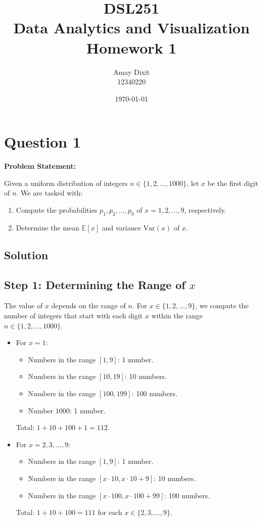 \documentclass[12pt]{article}
\title{DSL251 \\ Data Analytics and Visualization \\ Homework 1}
\author{Amay Dixit \\ 12340220}
\date{\today}
\begin{document}
\maketitle

\section*{Question 1}

\textbf{Problem Statement:}

Given a uniform distribution of integers \( n \in \{1, 2, \dots, 1000\} \), let \( x \) be the first digit of \( n \). We are tasked with:
\begin{enumerate}
    \item Compute the probabilities \( p_1, p_2, \dots, p_9 \) of \( x = 1, 2, \dots, 9 \), respectively.
    \item Determine the mean \( \mathbb{E}[x] \) and variance \( \mathrm{Var}(x) \) of \( x \).
\end{enumerate}

\subsection*{Solution}

\subsection*{Step 1: Determining the Range of \( x \)}

The value of \( x \) depends on the range of \( n \). For \( x \in \{1, 2, \dots, 9\} \), we compute the number of integers that start with each digit \( x \) within the range \( n \in \{1, 2, \dots, 1000\} \).

\begin{itemize}
    \item For \( x = 1 \):
    \begin{itemize}
        \item Numbers in the range \([1, 9]\): 1 number.
        \item Numbers in the range \([10, 19]\): 10 numbers.
        \item Numbers in the range \([100, 199]\): 100 numbers.
        \item Number \( 1000 \): 1 number.
    \end{itemize}
    Total: \( 1 + 10 + 100 + 1 = 112 \).
    
    \item For \( x = 2, 3, \dots, 9 \):
    \begin{itemize}
        \item Numbers in the range \([1, 9]\): 1 number.
        \item Numbers in the range \([x \cdot 10, x \cdot 10 + 9]\): 10 numbers.
        \item Numbers in the range \([x \cdot 100, x \cdot 100 + 99]\): 100 numbers.
    \end{itemize}
    Total: \( 1 + 10 + 100 = 111 \) for each \( x \in \{2, 3, \dots, 9\} \).
\end{itemize}
\end{document}

